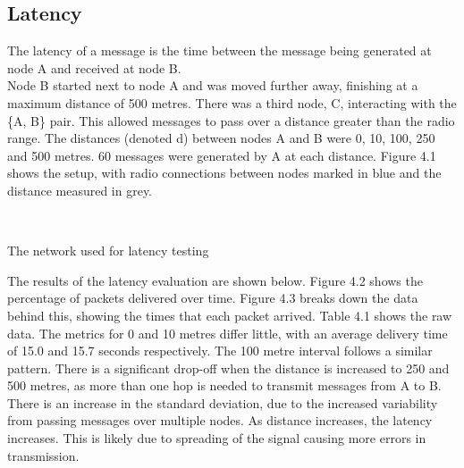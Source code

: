 \documentclass[12pt,a4paper]{report}
\makeatletter
\newenvironment{figurehere}
  {\def\@captype{figure}}
  {}
\makeatother
\begin{document}
\subsection{Latency}
The latency of a message is the time between the message being generated at node A and received at node B. \\
Node B started next to node A and was moved further away, finishing at a maximum distance of 500 metres. There was a third node, C, interacting with the \{A, B\} pair. This allowed messages to pass over a distance greater than the radio range. The distances (denoted d) between nodes A and B were 0, 10, 100, 250 and 500 metres. 60 messages were generated by A at each distance. Figure 4.1 shows the setup, with radio connections between nodes marked in blue and the distance measured in grey. 
\begin{figurehere}
\begin{center}
 \\
\end{center}
\caption{The network used for latency testing}
\end{figurehere}
\FloatBarrier
\bigskip
The results of the latency evaluation are shown below. Figure 4.2 shows the percentage of packets delivered over time. Figure 4.3 breaks down the data behind this, showing the times that each packet arrived. Table 4.1 shows the raw data. The metrics for 0 and 10 metres differ little, with an average delivery time of 15.0 and 15.7 seconds respectively. The 100 metre interval follows a similar pattern. There is a significant drop-off when the distance is increased to 250 and 500 metres, as more than one hop is needed to transmit messages from A to B. There is an increase in the standard deviation, due to the increased variability from passing messages over multiple nodes. As distance increases, the latency increases. This is likely due to spreading of the signal causing more errors in transmission. \\
\end{document}
